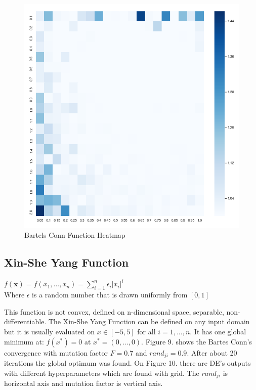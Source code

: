 \documentclass[A4, twocolumn]{article}
\begin{document}
 	\begin{figure}
 		\includegraphics[width=\linewidth]{bartels_conn/bartels_conn_heatmap.png}
 		\caption{Bartels Conn Function Heatmap}
 		\label{fig:Bartels Conn Function Heatmap}
 	\end{figure}
 
 
	 \subsection*{\textbf{Xin-She Yang Function}}
	 
	 $f(\mathbf x)=f(x_1, ...,x_n)=\sum_{i=1}^{n}\epsilon_i|x_i|^i$ \\
	 
	 Where $\epsilon$ is a random number that is drawn uniformly from $[0, 1]$
	 
	 This function is not convex, defined on n-dimensional space, separable, non-differentiable. The Xin-She Yang Function can be defined on any input domain but it is usually evaluated on $x \in [-5, 5]$ for all $i = 1,...,n$. It has one global minimum at: $f(x^*) = 0$ at $x^* = (0, ..., 0)$. Figure 9. shows the Bartes Conn's convergence with mutation factor $F = 0.7$ and $rand_{ji} = 0.9$. After about 20 iterations the global optimum was found. On Figure 10. there are DE's outputs with different hyperparameters which are found with grid. The $rand_{ji}$ is horizontal axis and mutation factor is vertical axis.
	 
\end{document}
